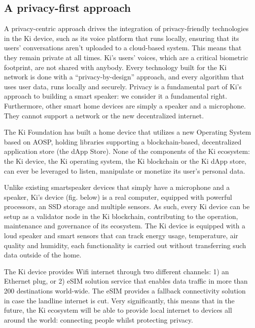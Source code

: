 \subsection{A privacy-first approach}
\label{sec:kideviceprivacy}
A privacy-centric approach drives the integration of privacy-friendly technologies in the Ki device, such as its voice platform that runs locally, ensuring that its users' conversations aren't uploaded to a cloud-based system. This means that they remain private at all times. Ki's users' voices, which are a critical biometric footprint, are not shared with anybody. Every technology built for the Ki network is done with a “privacy-by-design” approach, and every algorithm that uses user data, runs locally and securely. Privacy is a fundamental part of Ki's approach to building a smart speaker: we consider it a fundamental right. Furthermore, other smart home devices are simply a speaker and a microphone. They cannot support a network or the new decentralized internet.


The Ki Foundation has built a home device that utilizes a new Operating System based on AOSP, holding libraries supporting a blockchain-based, decentralized application store (the dApp Store). None of the components of the Ki ecosystem: the Ki device, the Ki operating system, the Ki blockchain or the Ki dApp store, can ever be leveraged to listen, manipulate or monetize its user's personal data. 

Unlike existing smartspeaker devices that simply have a microphone and a speaker, Ki's device (fig. below) is a real computer, equipped with powerful processors, an SSD storage and multiple sensors. As such, every Ki device can be setup as a validator node in the Ki blockchain, contributing to the operation, maintenance and governance of its ecosystem. The Ki device is equipped with a loud speaker and smart sensors that can track energy usage, temperature, air quality and humidity, each functionality is carried out without transferring such data outside of the home. 

The Ki device provides Wifi internet through two different channels: 1) an Ethernet plug, or 2) eSIM solution service that enables data traffic in more than 200 destinations world-wide. The eSIM provides a fallback connectivity solution in case the landline internet is cut. Very significantly, this means that in the future, the Ki ecosystem will be able to provide local internet to devices all around the world: connecting people whilst protecting privacy.



